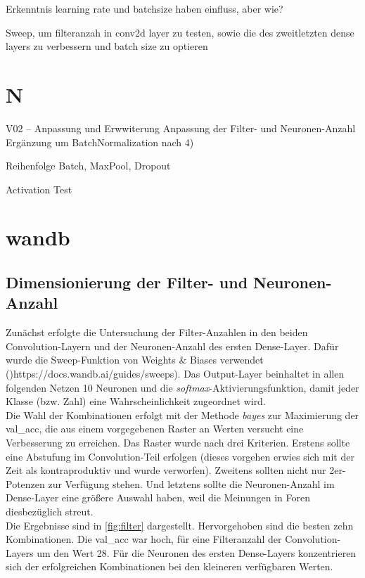 \documentclass[
fontsize=12pt,					%
paper=a4,						%
twoside=true, 					%
listof=totoc, 					%
bibliography=totoc,				%
titlepage, 						%
headsepline, 					%
DIV=12,							%
BCOR=6mm,						%
cleardoublepage=empty,			%
parskip,							%
ngerman
]{scrartcl}
\begin{document}
Erkenntnis learning rate und batchsize haben einfluss, aber wie?

Sweep, um filteranzah in conv2d layer zu testen, sowie die des zweitletzten dense layers zu verbessern und batch size zu optieren

\section{N}


V02 – Anpassung und Erwwiterung
Anpassung der Filter- und Neuronen-Anzahl
Ergänzung um BatchNormalization nach 4)

Reihenfolge Batch, MaxPool, Dropout

Activation Test

\section{wandb}

\subsection{Dimensionierung der Filter- und Neuronen-Anzahl}
Zunächst erfolgte die Untersuchung der Filter-Anzahlen in den beiden Convolution-Layern und der Neuronen-Anzahl des ersten Dense-Layer. Dafür wurde die Sweep-Funktion von Weights \& Biases verwendet ()https://docs.wandb.ai/guides/sweeps). Das Output-Layer beinhaltet in allen folgenden Netzen 10 Neuronen und die \emph{softmax}-Aktivierungsfunktion, damit jeder Klasse (bzw. Zahl) eine Wahrscheinlichkeit zugeordnet wird.\\
Die Wahl der Kombinationen erfolgt mit der Methode \emph{bayes} zur Maximierung der val\_acc, die aus einem vorgegebenen Raster an Werten versucht eine Verbesserung zu erreichen. Das Raster wurde nach drei Kriterien. Erstens sollte eine Abstufung im Convolution-Teil erfolgen (dieses vorgehen erwies sich mit der Zeit als kontraproduktiv und wurde verworfen). Zweitens sollten nicht nur 2er-Potenzen zur Verfügung stehen. Und letztens sollte die Neuronen-Anzahl im Dense-Layer eine größere Auswahl haben, weil die Meinungen in Foren diesbezüglich streut.\\
Die Ergebnisse sind in \autoref{fig:filter} dargestellt. Hervorgehoben sind die besten zehn Kombinationen. Die val\_acc war hoch, für eine Filteranzahl der Convolution-Layers um den Wert 28. Für die Neuronen des ersten Dense-Layers konzentrieren sich der erfolgreichen Kombinationen bei den kleineren verfügbaren Werten.
\end{document}
